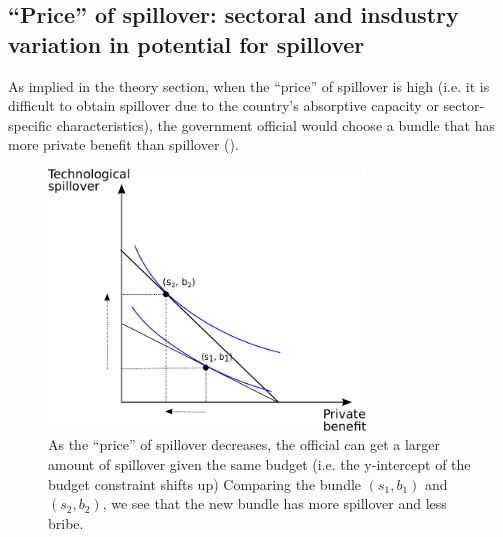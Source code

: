 \subsection{``Price'' of spillover: sectoral and insdustry variation in potential for spillover}

As implied in the theory section, when the ``price'' of spillover is high (i.e. it is difficult to obtain spillover due to the country's absorptive capacity or sector-specific characteristics), the government official would choose a bundle that has more private benefit than spillover (). 

\begin{figure}[!ht]
	\centering
    \includegraphics[width=0.75\textwidth, height=0.75\textheight,keepaspectratio]{../figure/price_of_spillover}
    \caption{As the ``price'' of spillover decreases, the official can get a larger amount of spillover given the same budget (i.e. the y-intercept of the budget constraint shifts up) Comparing the bundle $(s_1, b_1)$ and $(s_2, b_2)$, we see that the new bundle has more spillover and less bribe.}
    \label{fig:price_of_spillover}
\end{figure}

